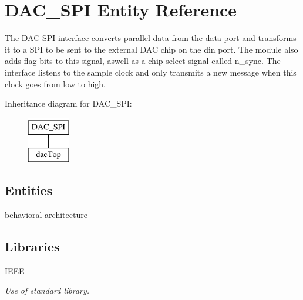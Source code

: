 \hypertarget{classDAC__SPI}{\section{D\-A\-C\-\_\-\-S\-P\-I Entity Reference}
\label{classDAC__SPI}
}


The D\-A\-C S\-P\-I interface converts parallel data from the data port and transforms it to a S\-P\-I to be sent to the external D\-A\-C chip on the din port. The module also adds flag bits to this signal, aswell as a chip select signal called n\-\_\-sync. The interface listens to the sample clock and only transmits a new message when this clock goes from low to high.  


Inheritance diagram for D\-A\-C\-\_\-\-S\-P\-I\-:\begin{figure}[H]
\begin{center}
\leavevmode
\includegraphics[height=2.000000cm]{classDAC__SPI}
\end{center}
\end{figure}
\subsection*{Entities}
\begin{DoxyCompactItemize}
\item 
\hyperlink{classDAC__SPI_1_1behavioral}{behavioral} architecture
\end{DoxyCompactItemize}
\subsection*{Libraries}
 \begin{DoxyCompactItemize}
\item 
\hypertarget{classDAC__SPI_ae4f03c286607f3181e16b9aa12d0c6d4}{\hyperlink{classDAC__SPI_ae4f03c286607f3181e16b9aa12d0c6d4}{I\-E\-E\-E} }\label{classDAC__SPI_ae4f03c286607f3181e16b9aa12d0c6d4}

\begin{DoxyCompactList}\small\item\em Use of standard library. \end{DoxyCompactList}\end{DoxyCompactItemize}
